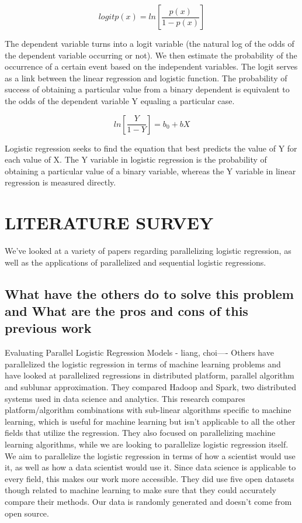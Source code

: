 \documentclass[letterpaper, 10 pt, conference]{ieeeconf}  %
\begin{document}
$$logit p(x) = ln[\frac{p(x)}{1-p(x)}]$$

The dependent variable turns into a logit variable (the natural log of the odds of the dependent variable occurring or not). We then estimate the probability of the occurrence of a certain event based on the independent variables. The logit serves as a link between the linear regression and logistic function. The probability of success of obtaining a particular value from a binary dependent is equivalent to the odds of the dependent variable Y equaling a particular case.

$$ln[\frac{Y}{1-Y}] = b_0 + bX$$

Logistic regression seeks to find the equation that best predicts the value of Y for each value of X. The Y variable in logistic regression is the probability of obtaining a particular value of a binary variable, whereas the Y variable in linear regression is measured directly. %


\section{LITERATURE SURVEY}
We've looked at a variety of papers regarding parallelizing logistic regression, as well as the applications of parallelized and sequential logistic regressions.

\subsection{What have the others do to solve this problem and What are the pros and cons of this previous work}
Evaluating Parallel Logistic Regression Models - liang, choi----
Others have parallelized the logistic regression in terms of machine learning problems and have looked at parallelized regressions in distributed platform, parallel algorithm and sublunar approximation. They compared Hadoop and Spark, two distributed systems used in data science and analytics. This research compares platform/algorithm combinations with sub-linear algorithms specific to machine learning, which is useful for machine learning but isn’t applicable to all the other fields that utilize the regression. They also focused on parallelizing machine learning algorithms, while we are looking to parallelize logistic regression itself. We aim to parallelize the logistic regression in terms of how a scientist would use it, as well as how a data scientist would use it. Since data science is applicable to every field, this makes our work more accessible. They did use five open datasets though related to machine learning to make sure that they could accurately compare their methods. Our data is randomly generated and doesn’t come from open source. 
\end{document}
